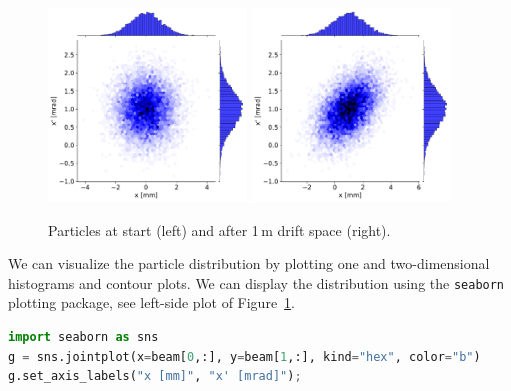 \documentclass{article}
\begin{document}
\begin{figure}[tb]
\begin{center}
\includegraphics[width=0.47\textwidth]{_img_primer/before_drift.pdf}
\hskip 5mm
\includegraphics[width=0.47\textwidth]{_img_primer/after_drift.pdf}
\end{center}
\caption{\label{fig:beam}Particles at start (left) and after 1\,m drift space (right).}
\end{figure}
We can visualize the particle distribution by plotting one and two-dimensional 
histograms and contour plots. We can display the distribution using the \texttt{seaborn} plotting package, see left-side plot of Figure~\ref{fig:beam}.

\begin{lstlisting}[language=Python]
import seaborn as sns
g = sns.jointplot(x=beam[0,:], y=beam[1,:], kind="hex", color="b")
g.set_axis_labels("x [mm]", "x' [mrad]");
\end{lstlisting}
\end{document}
